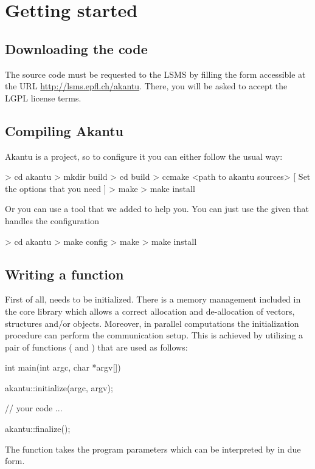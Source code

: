 \chapter{Getting started}
\section{Downloading the code}

The \akantu source code must be requested to the LSMS by
filling the form accessible at the URL \url{http://lsms.epfl.ch/akantu}.
There, you will be asked to accept the LGPL license terms.

\section{Compiling Akantu}

Akantu is a  project, so to configure it you can either follow the usual way:
\begin{command}
  > cd akantu
  > mkdir build
  > cd build
  > ccmake <path to akantu sources>
  [ Set the options that you need ]
  > make
  > make install
\end{command}

Or you can use a tool that we added to help you. You can just use the
given  that handles the  configuration

\begin{command}
  > cd akantu
  > make config
  > make
  > make install
\end{command}

\section{Writing a  function\label{sect:common:main}}

First of all, \akantu needs to be initialized.  There is a memory
management included in the core library which allows a correct
allocation and de-allocation of vectors, structures and/or
objects. Moreover, in parallel computations the initialization
procedure can perform the communication setup. This is achieved by
utilizing a pair of functions ( and )
that are used as follows:
\begin{cpp}
int main(int argc, char *argv[])
{
  akantu::initialize(argc, argv);

  // your code
  ...

  akantu::finalize();
}
\end{cpp}
The  function takes the program parameters which
can be interpreted by \akantu in due form.

